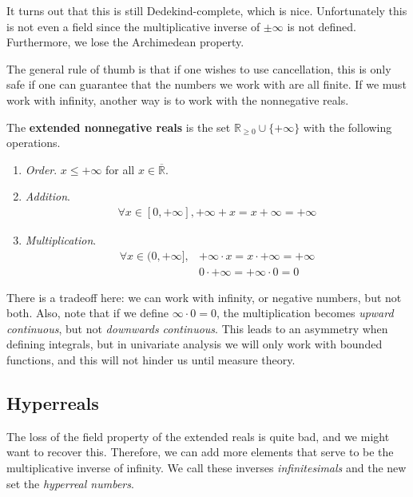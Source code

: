   It turns out that this is still Dedekind-complete, which is nice. Unfortunately this is not even a field since the multiplicative inverse of $\pm \infty$ is not defined. Furthermore, we lose the Archimedean property. 

  The general rule of thumb is that if one wishes to use cancellation, this is only safe if one can guarantee that the numbers we work with are all finite. If we must work with infinity, another way is to work with the nonnegative reals. 

  \begin{definition}
    \label{def:extended-real-number-line-2}
    The \textbf{extended nonnegative reals} is the set $\mathbb{R}_{\geq 0} \cup \{+\infty\}$ with the following operations. 
    \begin{enumerate}
      \item \textit{Order}. $x \leq +\infty$ for all $x \in \overline{\mathbb{R}}$. 
      \item \textit{Addition}. 
      \begin{align}
        \forall x \in [0, +\infty], +\infty + x = x + \infty = +\infty 
      \end{align}
    \item \textit{Multiplication}.
      \begin{align}
        \forall x \in (0, +\infty], & +\infty \cdot x = x \cdot +\infty = +\infty \\ 
                                    & 0 \cdot +\infty = +\infty \cdot 0 = 0 
      \end{align}
    \end{enumerate}
  \end{definition} 

  There is a tradeoff here: we can work with infinity, or negative numbers, but not both. Also, note that if we define $\infty \cdot 0 = 0$, the multiplication becomes \textit{upward continuous}, but not \textit{downwards continuous}. This leads to an asymmetry when defining integrals, but in univariate analysis we will only work with bounded functions, and this will not hinder us until measure theory. 

\subsection{Hyperreals}

  The loss of the field property of the extended reals is quite bad, and we might want to recover this. Therefore, we can add more elements that serve to be the multiplicative inverse of infinity. We call these inverses \textit{infinitesimals} and the new set the \textit{hyperreal numbers}. 

